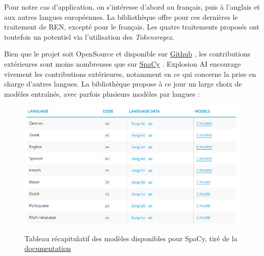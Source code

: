 Pour notre cas d'application, on s'intéresse d'abord au français, puis à l'anglais et aux autres langues européennes. La bibliothèque offre pour ces dernières le traitement de REN, excepté pour le français. Les quatre traitements proposés ont toutefois un potentiel via l'utilisation des \textit{Tokensregex}.
\newline

 Bien que le projet soit OpenSource et disponible sur \href{https://github.com/stanfordnlp/CoreNLP}{Github} \cite{corenlp-repo}, les contributions extérieures sont moins nombreuses que sur \href{https://github.com/explosion/spaCy}{SpaCy} \cite{spacy-repo}. Explosion AI encourage vivement les contributions extérieures, notamment en ce qui concerne la prise en charge d'autres langues. La bibliothèque propose à ce jour un large choix de modèles entraînés, avec parfois plusieurs modèles par langues :
 \vspace{10pt}
\begin{figure}[H]
    \centering
    \includegraphics[scale=0.7]{images/spacy-lang.png}
    \caption{Tableau récapitulatif des modèles disponibles pour SpaCy, tiré de la \href{https://spacy.io/usage/models}{documentation}} \cite{spacy-lang}
    \label{fig:spacy-lang}
\end{figure}
\vspace{10pt}

